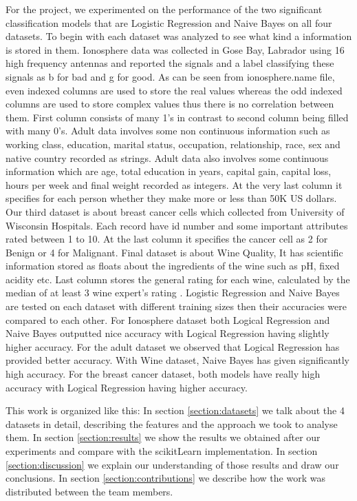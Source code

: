 \documentclass{article}
\begin{document}
For the project, we experimented on the performance of the two significant classification models that are Logistic Regression and Naive Bayes on all four datasets. To begin with each dataset was analyzed to see what kind a information is stored in them. Ionosphere data was collected in Gose Bay, Labrador using 16 high frequency antennas and reported the signals and a label classifying these signals as b for bad and g for good. As can be seen from ionosphere.name file, even indexed columns are used to store the real values whereas the odd indexed columns are used to store complex values thus there is no correlation between them. First column consists of many 1's in contrast to second column being filled with many 0's.    \cite{ionosphere} Adult data involves some non continuous information such as working class, education, marital status, occupation, relationship, race, sex and native country recorded as strings. Adult data also involves some continuous information which are age, total education in years, capital gain, capital loss, hours per week and final weight recorded as integers. At the very last column it specifies for each person whether they make more or less than 50K US dollars. Our third dataset is about breast cancer cells which collected from University of Wisconsin Hospitals. Each record have id number and some important attributes rated between 1 to 10. At the last column it specifies the cancer cell as 2 for Benign or 4 for Malignant. Final dataset is about Wine Quality, It has scientific information stored as floats about the ingredients of the wine such as pH, fixed acidity etc. Last column stores the general rating for each wine, calculated by the median of at least 3 wine expert's rating \cite{wine}. Logistic Regression and Naive Bayes are tested on each dataset with different training sizes then their accuracies were compared to each other. For Ionosphere dataset both Logical Regression and Naive Bayes outputted nice accuracy with Logical Regression having slightly higher accuracy. For the adult dataset we observed that Logical Regression has provided better accuracy. With Wine dataset, Naive Bayes has given significantly high accuracy. For the breast cancer dataset, both models have really high accuracy with Logical Regression having higher accuracy.

This work is organized like this: In section \ref{section:datasets} we talk about the 4 datasets in detail, describing the features and the approach we took to analyse them. In section \ref{section:results} we show the results we obtained after our experiments and compare with the scikitLearn implementation. In section \ref{section:discussion} we explain our understanding of those results and draw our conclusions. In section \ref{section:contributions} we describe how the work was distributed between the team members.
\end{document}
